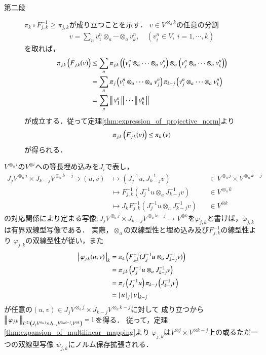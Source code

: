 \begin{prf}
\begin{description}
			\item[第二段]
				$\pi_k \circ F^{-1}_{j,k} \geq \pi_{j,k}$が成り立つことを示す．
				$v \in V^{\otimes_a k}$の任意の分割
				\begin{align}
					v = \sum_n v^n_1 \otimes_a \cdots \otimes_a v^n_k,
					\quad (v^n_i \in V,\ i=1,\cdots,k)
				\end{align}
				を取れば，
				\begin{align}
					\projectivenorm{F_{j,k}(v)}{j,k}
					&\leq \sum_n \projectivenorm{\left( v^n_1 \otimes_a \cdots \otimes_a v^n_j \right) \otimes_a \left( v^n_j \otimes_a \cdots \otimes_a v^n_k \right)}{j,k} \\
					&= \sum_n \projectivenorm{v^n_1 \otimes_a \cdots \otimes_a v^n_j}{j}
						\projectivenorm{v^n_j \otimes_a \cdots \otimes_a v^n_k}{k-j} \\
					&= \sum_n \Norm{v^n_1}{} \cdots \Norm{v^n_k}{}
				\end{align}
				が成立する．従って定理\ref{thm:expression_of_projective_norm}より
				\begin{align}
					\projectivenorm{F_{j,k}(v)}{j,k} \leq \projectivenorm{v}{k}
				\end{align}
				が得られる．
				\QED
		\end{description}
	\end{prf}
	
	
	$V^{\otimes_a i}$の$V^{\otimes i}$への等長埋め込みを$J_i$で表し，
	\begin{align}
		J_j V^{\otimes_a j} \times J_{k-j} V^{\otimes_a k-j} \ni (u,v)
		& \longmapsto ( J_j^{-1}u,J_{k-j}^{-1}v ) &&\in V^{\otimes_a j} \times V^{\otimes_a k-j} \\
		& \longmapsto F_{j,k}^{-1} (J_j^{-1}u \otimes_a J_{k-j}^{-1}v) &&\in V^{\otimes_a k} \\
		& \longmapsto J_k F_{j,k}^{-1} (J_j^{-1}u \otimes_a J_{k-j}^{-1}v) &&\in V^{\otimes k}
	\end{align}
	の対応関係により定まる写像$:J_j V^{\otimes_a j} \times J_{k-j} V^{\otimes_a k-j}
	\longrightarrow V^{\otimes k}$を$\varphi_{j,k}$と書けば，$\varphi_{j,k}$は有界双線型写像である．
	実際，$\otimes_a$の双線型性と埋め込み及び$F_{j,k}^{-1}$の線型性より
	$\varphi_{j,k}$の双線型性が従い，また
	\begin{align}
		\compcrossnorm{\varphi_{j,k}(u,v)}{k}
		&= \projectivenorm{F_{j,k}^{-1} (J_j^{-1}u \otimes_a J_{k-j}^{-1}v)}{k} \\
		&= \projectivenorm{J_j^{-1}u \otimes_a J_{k-j}^{-1}v}{j,k} \\
		&= \projectivenorm{J_j^{-1}u}{j} \projectivenorm{J_{k-j}^{-1}v}{k-j} \\
		&= \compcrossnorm{u}{j} \compcrossnorm{v}{k-j}
	\end{align}
	が任意の$(u,v) \in J_j V^{\otimes_a j} \times J_{k-j} V^{\otimes_a k-j}$に対して
	成り立つから$\Norm{\varphi_{j,k}}{\ContLn{J_j V^{\otimes_a j} \times J_{k-j} V^{\otimes_a k-j}}{V^{\otimes k}}{2}} = 1$を得る．
	従って，定理\ref{thm:expansion_of_multilinear_mapping}より
	$\varphi_{j,k}$は$V^{\otimes j} \times V^{\otimes k-j}$上の或るただ一つの双線型写像
	$\psi_{j,k}$にノルム保存拡張される．
	
